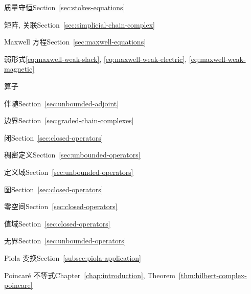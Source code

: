 \begin{theindex}
\item {}\label{index:mass-conservation}{质量守恒}\quad Section~\ref{sec:stokes-equations}

\item {}\label{index:matrix-incidence}{矩阵, 关联}\quad Section~\ref{sec:simplicial-chain-complex}

\item {}\label{index:maxwell-s-equations}{Maxwell 方程}\quad Section~\ref{sec:maxwell-equations}

\subitem {}\label{index:maxwell-s-equations-weak-formulation}{弱形式}\quad \eqref{eq:maxwell-weak-slack}, \eqref{eq:maxwell-weak-electric}, \eqref{eq:maxwell-weak-magnetic}

\item {}\label{index:operator}{算子}

\subitem {}\label{index:operator-adjoint}{伴随}\quad Section~\ref{sec:unbounded-adjoint}

\subitem {}\label{index:operator-boundary}{边界}\quad Section~\ref{sec:graded-chain-complexes}

\subitem {}\label{index:operator-closed}{闭}\quad Section~\ref{sec:closed-operators}

\subitem {}\label{index:operator-densely-defined}{稠密定义}\quad Section~\ref{sec:unbounded-operators}

\subitem {}\label{index:operator-domain-of}{定义域}\quad Section~\ref{sec:unbounded-operators}

\subitem {}\label{index:operator-graph}{图}\quad Section~\ref{sec:closed-operators}

\subitem {}\label{index:operator-null-space}{零空间}\quad Section~\ref{sec:closed-operators}

\subitem {}\label{index:operator-range}{值域}\quad Section~\ref{sec:closed-operators}

\subitem {}\label{index:operator-unbounded}{无界}\quad Section~\ref{sec:unbounded-operators}

\item {}\label{index:piola-transform}{Piola 变换}\quad Section~\ref{subsec:piola-application}

\item {}\label{index:poincar-inequality}{Poincaré 不等式}\quad Chapter~\ref{chap:introduction}, Theorem~\ref{thm:hilbert-complex-poincare}


\end{theindex}
